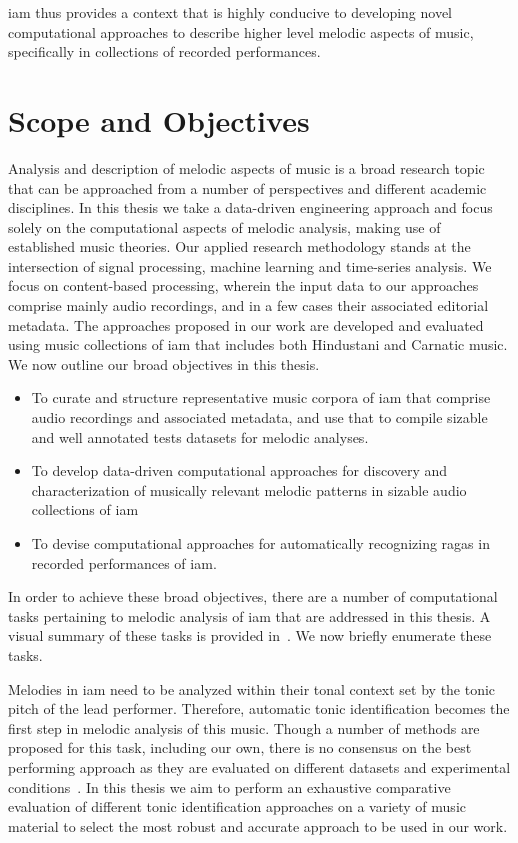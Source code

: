 \gls{iam} thus provides a context that is highly conducive to developing novel computational approaches to describe higher level melodic aspects of music, specifically in collections of recorded performances. 


\section{Scope and Objectives}
\label{sec:scope_objectives}

Analysis and description of melodic aspects of music is a broad research topic that can be approached from a number of perspectives and different academic disciplines. In this thesis we take a data-driven engineering approach and focus solely on the computational aspects of melodic analysis, making use of established music theories. Our applied research methodology stands at the intersection of signal processing, machine learning and time-series analysis. We focus on content-based processing, wherein the input data to our approaches comprise mainly audio recordings, and in a few cases their associated editorial metadata. The approaches proposed in our work are developed and evaluated using music collections of \gls{iam} that includes both Hindustani and Carnatic music. We now outline our broad objectives in this thesis.

\begin{itemize}
	\item To curate and structure representative music corpora of \gls{iam} that comprise audio recordings and associated metadata, and use that to compile sizable and well annotated tests datasets for melodic analyses.
	\item To develop data-driven computational approaches for discovery and characterization of musically relevant melodic patterns in sizable audio collections of \gls{iam}
	\item To devise computational approaches for automatically recognizing \glspl{raga} in recorded performances of \gls{iam}.
\end{itemize}

In order to achieve these broad objectives, there are a number of computational tasks pertaining to melodic analysis of \gls{iam} that are addressed in this thesis. A visual summary of these tasks is provided in~. We now briefly enumerate these tasks.

Melodies in \gls{iam} need to be analyzed within their tonal context set by the tonic pitch of the lead performer. Therefore, automatic tonic identification becomes the first step in melodic analysis of this music. Though a number of methods are proposed for this task, including our own, there is no consensus on the best performing approach as they are evaluated on different datasets and experimental conditions~\citep{Gulati2014Tonic}. In this thesis we aim to perform an exhaustive comparative evaluation of different tonic identification approaches on a variety of music material to select the most robust and accurate approach to be used in our work. 

